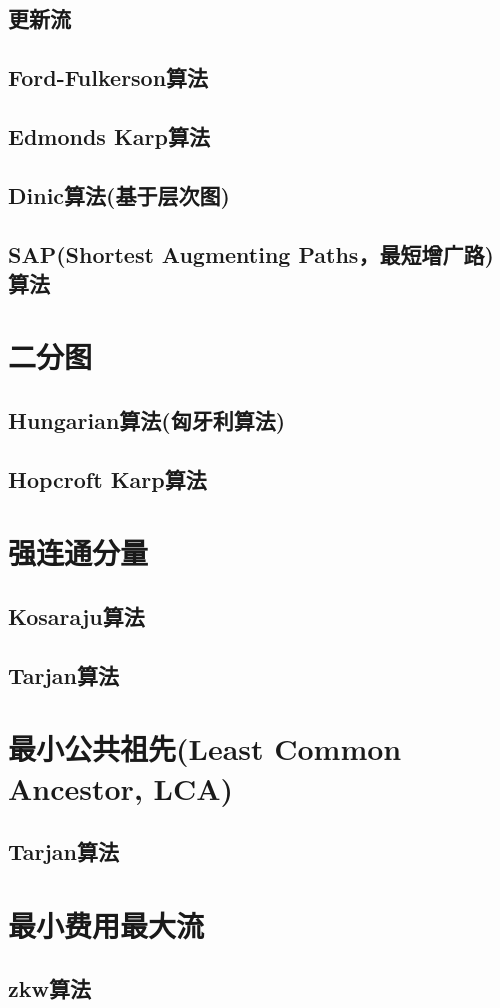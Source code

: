 \subsection{更新流}
\subsection{Ford-Fulkerson算法}
\subsection{Edmonds Karp算法}
\subsection{Dinic算法(基于层次图)}
\subsection{SAP(Shortest Augmenting Paths，最短增广路)算法}

\section{二分图}
\subsection{Hungarian算法(匈牙利算法)}
\subsection{Hopcroft Karp算法}

\section{强连通分量}
\subsection{Kosaraju算法}
\subsection{Tarjan算法}

\section{最小公共祖先(Least Common Ancestor, LCA)}
\subsection{Tarjan算法}

\section{最小费用最大流}
\subsection{zkw算法}
